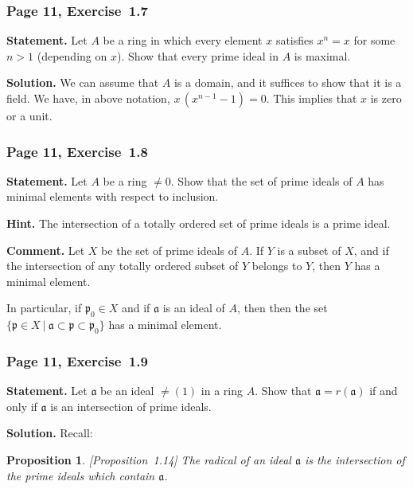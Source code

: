 \documentclass[12pt,letterpaper]{article}%
\newcommand{\mf}{\mathfrak}
\newcommand{\aaa}{\mf a}
\newcommand{\ppp}{\mf p}
\newcommand{\nn}{\noindent}
\newtheorem{prop}[thm]{Proposition}
\begin{document}
\subsubsection{Page 11, Exercise~1.7}\label{ex1.7}%

\textbf{Statement.} Let $A$ be a ring in which every element $x$ satisfies $x^n=x$ for some $n>1$ (depending on $x$). Show that every prime ideal in $A$ is maximal.

\nn\textbf{Solution.} We can assume that $A$ is a domain, and it suffices to show that it is a field. We have, in above notation, $x\,(x^{n-1}-1)=0$. This implies that $x$ is zero or a unit.

\subsubsection{Page 11, Exercise~1.8}\label{ex1.8}%

\textbf{Statement.} Let $A$ be a ring $\ne0$. Show that the set of prime ideals of $A$ has minimal elements with respect to inclusion.

\nn\textbf{Hint.} The intersection of a totally ordered set of prime ideals is a prime ideal.

\nn\textbf{Comment.} Let $X$ be the set of prime ideals of $A$. If $Y$ is a subset of $X$, and if the intersection of any totally ordered subset of $Y$ belongs to $Y$, then $Y$ has a minimal element.

In particular, if $\ppp_0\in X$ and if $\aaa$ is an ideal of $A$, then then the set $\{\ppp\in X\ |\ \aaa\subset\ppp\subset\ppp_0\}$ has a minimal element.

\subsubsection{Page 11, Exercise~1.9}%

\textbf{Statement.} Let $\aaa$ be an ideal $\ne(1)$ in a ring $A$. Show that $\aaa=r(\aaa)$ if and only if $\aaa$ is an intersection of prime ideals.

\nn\textbf{Solution.} %
Recall:

\begin{prop}\label{p114}[Proposition~1.14] The radical of an ideal $\aaa$ is the intersection of the prime ideals which contain $\aaa$.
\end{prop}
\end{document}
